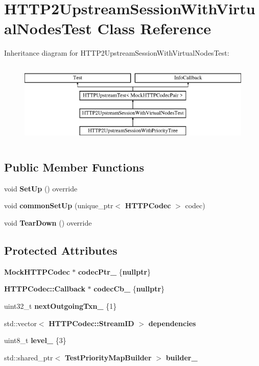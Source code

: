 \section{H\+T\+T\+P2\+Upstream\+Session\+With\+Virtual\+Nodes\+Test Class Reference}
\label{classHTTP2UpstreamSessionWithVirtualNodesTest}
Inheritance diagram for H\+T\+T\+P2\+Upstream\+Session\+With\+Virtual\+Nodes\+Test\+:\begin{figure}[H]
\begin{center}
\leavevmode
\includegraphics[height=4.000000cm]{classHTTP2UpstreamSessionWithVirtualNodesTest}
\end{center}
\end{figure}
\subsection*{Public Member Functions}
\begin{DoxyCompactItemize}
\item 
void {\bf Set\+Up} () override
\item 
void {\bf common\+Set\+Up} (unique\+\_\+ptr$<$ {\bf H\+T\+T\+P\+Codec} $>$ codec)
\item 
void {\bf Tear\+Down} () override
\end{DoxyCompactItemize}
\subsection*{Protected Attributes}
\begin{DoxyCompactItemize}
\item 
{\bf Mock\+H\+T\+T\+P\+Codec} $\ast$ {\bf codec\+Ptr\+\_\+} \{{\bf nullptr}\}
\item 
{\bf H\+T\+T\+P\+Codec\+::\+Callback} $\ast$ {\bf codec\+Cb\+\_\+} \{{\bf nullptr}\}
\item 
uint32\+\_\+t {\bf next\+Outgoing\+Txn\+\_\+} \{1\}
\item 
std\+::vector$<$ {\bf H\+T\+T\+P\+Codec\+::\+Stream\+ID} $>$ {\bf dependencies}
\item 
uint8\+\_\+t {\bf level\+\_\+} \{3\}
\item 
std\+::shared\+\_\+ptr$<$ {\bf Test\+Priority\+Map\+Builder} $>$ {\bf builder\+\_\+}
\end{DoxyCompactItemize}


